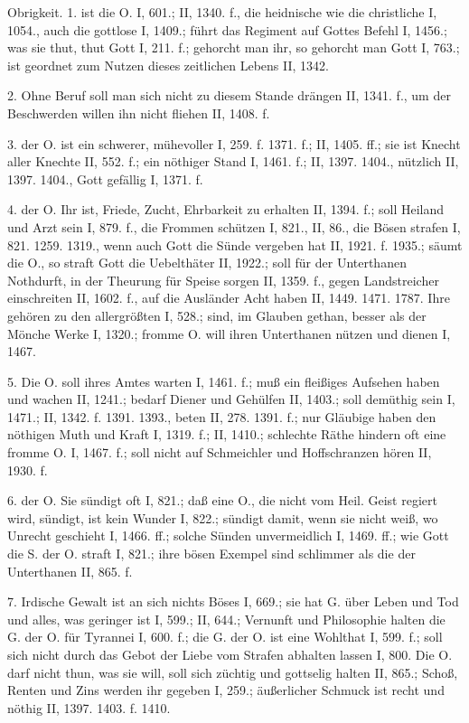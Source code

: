 Obrigkeit. 1.  ist die O. I, 601.; II, 1340. f., die heidnische wie die christliche I, 1054., auch die gottlose I, 1409.; führt das Regiment auf Gottes Befehl I, 1456.; was sie thut, thut Gott I, 211. f.; gehorcht man ihr, so gehorcht man Gott I, 763.; ist geordnet zum Nutzen dieses zeitlichen Lebens II, 1342.

2.  Ohne Beruf soll man sich nicht zu diesem Stande drängen II, 1341. f., um der Beschwerden willen ihn nicht fliehen II, 1408. f.

3.  der O. ist ein schwerer, mühevoller I, 259. f. 1371. f.; II, 1405. ff.; sie ist Knecht aller Knechte II, 552. f.; ein nöthiger Stand I, 1461. f.; II, 1397. 1404., nützlich II, 1397. 1404., Gott gefällig I, 1371. f.

4.  der O. Ihr  ist, Friede, Zucht, Ehrbarkeit zu erhalten II, 1394. f.; soll Heiland und Arzt sein I, 879. f., die Frommen schützen I, 821., II, 86., die Bösen strafen I, 821. 1259. 1319., wenn auch Gott die Sünde vergeben hat II, 1921. f. 1935.; säumt die O., so straft Gott die Uebelthäter II, 1922.; soll für der Unterthanen Nothdurft, in der Theurung für Speise sorgen II, 1359. f., gegen Landstreicher einschreiten II, 1602. f., auf die Ausländer Acht haben II, 1449. 1471. 1787. Ihre  gehören zu den allergrößten I, 528.; sind, im Glauben gethan, besser als der Mönche Werke I, 1320.; fromme O. will ihren Unterthanen nützen und dienen I, 1467.

5.  Die O. soll ihres Amtes warten I, 1461. f.; muß ein fleißiges Aufsehen haben und wachen II, 1241.; bedarf Diener und Gehülfen II, 1403.; soll demüthig sein I, 1471.; II, 1342. f. 1391. 1393., beten II, 278. 1391. f.; nur Gläubige haben den nöthigen Muth und Kraft I, 1319. f.; II, 1410.; schlechte Räthe hindern oft eine fromme O. I, 1467. f.; soll nicht auf Schmeichler und Hoffschranzen hören II, 1930. f.

6.  der O. Sie sündigt oft I, 821.; daß eine O., die nicht vom Heil. Geist regiert wird, sündigt, ist kein Wunder I, 822.; sündigt damit, wenn sie nicht weiß, wo Unrecht geschieht I, 1466. ff.; solche Sünden unvermeidlich I, 1469. ff.; wie Gott die S. der O. straft I, 821.; ihre bösen Exempel sind schlimmer als die der Unterthanen II, 865. f.

7.  Irdische Gewalt ist an sich nichts Böses I, 669.; sie hat G. über Leben und Tod und alles, was geringer ist I, 599.; II, 644.; Vernunft und Philosophie halten die G. der O. für Tyrannei I, 600. f.; die G. der O. ist eine Wohlthat I, 599. f.; soll sich nicht durch das Gebot der Liebe vom Strafen abhalten lassen I, 800. Die O. darf nicht thun, was sie will, soll sich züchtig und gottselig halten II, 865.; Schoß, Renten und Zins werden ihr gegeben I, 259.; äußerlicher Schmuck ist recht und nöthig II, 1397. 1403. f. 1410.

